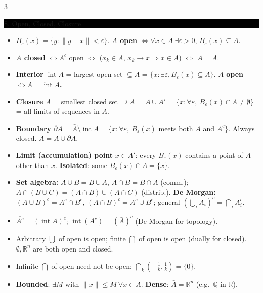 \documentclass[8pt,letterpaper]{article}
\makeatletter
\newcommand{\sect}[1]{%
  \vspace{2.2pt}%
  \noindent\colorbox{black}{\parbox{\dimexpr\linewidth-2\fboxsep}{%
    \color{white}\bfseries\scshape\fontsize{6.4}{7.4}\selectfont
    \hyphenpenalty=10000\exhyphenpenalty=10000\raggedright #1}}%
  \vspace{1.4pt}\par\nopagebreak\@afterheading}
\newenvironment{tl}
  {\begin{itemize}[leftmargin=6pt,itemsep=0.3pt,topsep=1pt,parsep=0pt,
                   partopsep=0pt,label=\textcolor{gray}{\tiny$\bullet$}]}
  {\end{itemize}}
\newcommand{\R}{\mathbb{R}}
\newcommand{\Rn}{\mathbb{R}^n}
\newcommand{\intr}{\operatorname{int}}
\newcommand{\nm}[1]{\lVert #1\rVert}
\makeatother
\begin{document}
\begin{multicols}{3}
\sect{8. Open, Closed, Closure}
\begin{tl}
\item $B_\varepsilon(x)=\{y:\nm{y-x}<\varepsilon\}$. \textbf{$A$ open} $\iff\forall x\in A\ \exists\varepsilon>0$, $B_\varepsilon(x)\subseteq A$.
\item \textbf{$A$ closed} $\iff A^c$ open $\iff$ ($x_k\in A$, $x_k\to x\Rightarrow x\in A$) $\iff$ \textbf{$A=\bar A$}.
\item \textbf{Interior} $\intr A$ = largest open set $\subseteq A$ = $\{x: \exists\varepsilon, B_\varepsilon(x)\subseteq A\}$. \textbf{$A$ open $\iff A=\intr A$.}
\item \textbf{Closure} $\bar A$ = smallest closed set $\supseteq A$ = $A\cup A'$ = $\{x: \forall\varepsilon,\ B_\varepsilon(x)\cap A\ne\emptyset\}$ = all limits of sequences in $A$.
\item \textbf{Boundary} $\partial A=\bar A\setminus\intr A=\{x:\forall\varepsilon,\ B_\varepsilon(x)$ meets both $A$ and $A^c\}$. Always closed. $\bar A=A\cup\partial A$.
\item \textbf{Limit (accumulation) point} $x\in A'$: every $B_\varepsilon(x)$ contains a point of $A$ other than $x$. \textbf{Isolated}: some $B_\varepsilon(x)\cap A=\{x\}$.
\item \textbf{Set algebra:} $A\cup B=B\cup A$, $A\cap B=B\cap A$ (comm.); $A\cap(B\cup C)=(A\cap B)\cup(A\cap C)$ (distrib.). \textbf{De Morgan:} $(A\cup B)^c=A^c\cap B^c$, $(A\cap B)^c=A^c\cup B^c$; general $\left(\bigcup_iA_i\right)^c=\bigcap_iA_i^c$.
\item $\overline{A^c}=(\intr A)^c$; $\intr(A^c)=(\bar A)^c$ (De Morgan for topology).
\item Arbitrary $\bigcup$ of open is open; finite $\bigcap$ of open is open (dually for closed). $\emptyset,\Rn$ are both open and closed.
\item \colorbox{black!12}{Infinite $\bigcap$ of open need not be open:} $\bigcap_k(-\frac1k,\frac1k)=\{0\}$.
\item \textbf{Bounded}: $\exists M$ with $\nm{x}\le M\ \forall x\in A$. \textbf{Dense}: $\bar A=\Rn$ (e.g.\ $\mathbb Q$ in $\R$).
\end{tl}
\vspace{\baselineskip}
\vspace{\baselineskip}


\end{multicols}
\end{document}
